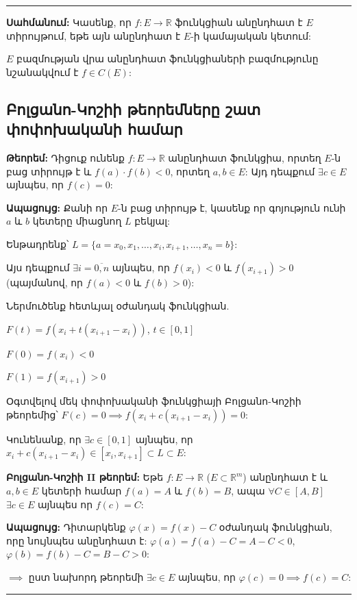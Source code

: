 \documentclass[12pt, a4paper]{article}
\begin{document}
\vspace{1em}
\hrule
\vspace{1em}

\textbf{Սահմանում:} Կասենք, որ $f: E \to \mathbb{R}$ ֆունկցիան անընդհատ է $E$ տիրույթում, եթե այն անընդհատ է $E$-ի կամայական կետում:

$E$ բազմության վրա անընդհատ ֆունկցիաների բազմությունը նշանակվում է $f \in C(E)$:

\subsection{Բոլցանո-Կոշիի թեորեմները շատ փոփոխականի համար}

\textbf{Թեորեմ:} Դիցուք ունենք $f: E \to \mathbb{R}$ անընդհատ ֆունկցիա, որտեղ $E$-ն բաց տիրույթ է և $f(a) \cdot f(b) < 0$, որտեղ $a, b \in E$: Այդ դեպքում $\exists c \in E$ այնպես, որ $f(c) = 0$:

\textbf{Ապացույց:} Քանի որ $E$-ն բաց տիրույթ է, կասենք որ գոյություն ունի $a$ և $b$ կետերը միացնող $L$ բեկյալ:

Ենթադրենք՝ $L = \{ a = x_0, x_1, \dots, x_i, x_{i+1}, \dots, x_n = b \}$:

Այս դեպքում $\exists i = \overline{0, n}$ այնպես, որ $f(x_i) < 0$ և $f(x_{i+1}) > 0$ (պայմանով, որ $f(a) < 0$ և $f(b) > 0$):

Ներմուծենք հետևյալ օժանդակ ֆունկցիան.

$F(t) = f(x_i + t(x_{i+1} - x_i))$, $t \in [0, 1]$

$F(0) = f(x_i) < 0$

$F(1) = f(x_{i+1}) > 0$

Օգտվելով մեկ փոփոխականի ֆունկցիայի Բոլցանո-Կոշիի թեորեմից՝ $F(c) = 0 \implies f(x_i + c(x_{i+1} - x_i)) = 0$:

Կունենանք, որ $\exists c \in [0, 1]$ այնպես, որ $x_i + c(x_{i+1} - x_i) \in [x_i, x_{i+1}] \subset L \subset E$:

\textbf{Բոլցանո-Կոշիի II թեորեմ:} Եթե $f: E \to \mathbb{R}$ ($E \subset \mathbb{R}^m$) անընդհատ է և $a, b \in E$ կետերի համար $f(a) = A$ և $f(b) = B$, ապա $\forall C \in [A, B]$ $\exists c \in E$ այնպես որ $f(c) = C$:

\textbf{Ապացույց:} Դիտարկենք $\varphi(x) = f(x) - C$ օժանդակ ֆունկցիան, որը նույնպես անընդհատ է: $\varphi(a) = f(a) - C = A - C < 0$, $\varphi(b) = f(b) - C = B - C > 0$:

$\implies$ ըստ նախորդ թեորեմի $\exists c \in E$ այնպես, որ $\varphi(c) = 0 \implies f(c) = C$:

\vspace{1em}
\hrule
\vspace{1em}
\end{document}
